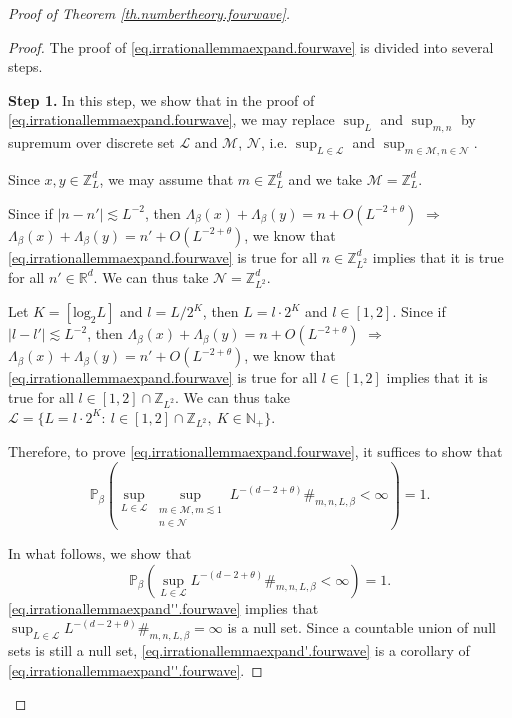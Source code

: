 \begin{proof}[Proof of Theorem \ref{th.numbertheory.fourwave}]
\begin{proof}
The proof of \eqref{eq.irrationallemmaexpand.fourwave} is divided into several steps.

\textbf{Step 1.} In this step, we show that in the proof of \eqref{eq.irrationallemmaexpand.fourwave}, we may replace $\sup_{L}$ and $\sup_{m,n}$ by supremum over discrete set $\mathcal{L}$ and $\mathcal{M}$, $\mathcal{N}$, i.e. $\sup_{L\in \mathcal{L}}$ and $\sup_{m\in\mathcal{M},n\in\mathcal{N}}$.

Since $x,y\in \mathbb{Z}_L^d$, we may assume that $m\in \mathbb{Z}_{L}^d$ and we take $\mathcal{M}=\mathbb{Z}_{L}^d$.

Since if $|n-n'|\lesssim L^{-2}$, then $\Lambda_{\beta}(x)+\Lambda_{\beta}(y)=n+O(L^{-2+\theta})$ $\Rightarrow$ $\Lambda_{\beta}(x)+\Lambda_{\beta}(y)=n'+O(L^{-2+\theta})$, we know that \eqref{eq.irrationallemmaexpand.fourwave} is true for all $n\in\mathbb{Z}_{L^2}^d$ implies that it is true for all $n'\in\mathbb{R}^d$. We can thus take $\mathcal{N}=\mathbb{Z}_{L^2}^d$.

Let $K=[\text{log}_2 L]$ and $l=L/2^K$, then $L=l\cdot 2^K$ and $l\in [1,2]$. Since if $|l-l'|\lesssim L^{-2}$, then $\Lambda_{\beta}(x)+\Lambda_{\beta}(y)=n+O(L^{-2+\theta})$ $\Rightarrow$ $\Lambda_{\beta}(x)+\Lambda_{\beta}(y)=n'+O(L^{-2+\theta})$, we know that \eqref{eq.irrationallemmaexpand.fourwave} is true for all $l\in [1,2]$ implies that it is true for all $l\in [1,2]\cap \mathbb{Z}_{L^2}$. We can thus take $\mathcal{L}=\{L=l\cdot 2^K:\ l\in [1,2]\cap \mathbb{Z}_{L^2},\ K\in \mathbb{N}_+\}$.

Therefore, to prove \eqref{eq.irrationallemmaexpand.fourwave}, it suffices to show that 
\begin{equation}\label{eq.irrationallemmaexpand'.fourwave}
    \mathbb{P}_{\beta}\left(\sup_{L\in \mathcal{L}}\sup_{\substack{m\in \mathcal{M},m\lesssim 1\\n\in \mathcal{N}}}  L^{-(d-2+\theta)}\#_{m,n,L,\beta} <\infty\right)=1.
\end{equation}

In what follows, we show that 
\begin{equation}\label{eq.irrationallemmaexpand''.fourwave}
    \mathbb{P}_{\beta}\left(\sup_{L\in \mathcal{L}}L^{-(d-2+\theta)}\#_{m,n,L,\beta} <\infty \right)=1.
\end{equation}
\eqref{eq.irrationallemmaexpand''.fourwave} implies that $\sup_{L\in \mathcal{L}}L^{-(d-2+\theta)}\#_{m,n,L,\beta} =\infty$ is a null set. Since a countable union of null sets is still a null set, \eqref{eq.irrationallemmaexpand'.fourwave} is a corollary of \eqref{eq.irrationallemmaexpand''.fourwave}.


\end{proof}
\end{proof}
